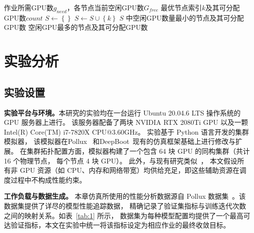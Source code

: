 \begin{algorithm}[htbp]
  \caption{节点选择}
  \label{alg:selectnode}
  \begin{algorithmic}[1]
    \REQUIRE 作业所需GPU数$g_{need}$，各节点当前空闲GPU数$G_{free}$
    \ENSURE 最优节点索引$k$及其可分配GPU数$count$
    \STATE $S \leftarrow \left\{\right\}$
        \STATE $S \leftarrow S \cup \left\{k\right\}$
      \ENDIF
    \ENDFOR
      \RETURN $S$ 中空闲GPU数量最小的节点及其可分配GPU数
    \ELSE
      \RETURN 空闲GPU最多的节点及其可分配GPU数
    \ENDIF
  \end{algorithmic}
\end{algorithm}

\section{实验分析}\label{sec:chap3-experiment}

\subsection{实验设置}\label{subsec:experiment-setup}

\textbf{实验平台与环境。}本研究的实验均在一台运行 Ubuntu 20.04.6 LTS 操作系统的 GPU 服务器上进行。
该服务器配备了两块 NVIDIA RTX 2080Ti GPU 以及一颗 Intel(R) Core(TM) i7-7820X CPU@3.60GHz。
实验基于 Python 语言开发的集群模拟器，
该模拟器在Pollux~\cite{qiao2021pollux} 和DeepBoot~\cite{chen2023deepboot}现有的仿真框架基础上进行修改与扩展。
在集群拓扑配置方面，模拟器构建了一个包含 64 块 GPU 的同构集群（共计 16 个物理节点， 每个节点 4 块 GPU）。
此外，与现有研究类似~\cite{gu2023elasticflow,jayaram2023sia}，
本文假设所有非 GPU 资源（如 CPU、内存和网络带宽）均供给充足，即这些辅助资源在调度过程中不构成性能约束。

\textbf{工作负载与数据生成。}
本章仿真所使用的性能分析数据源自 Pollux 数据集~\cite{qiao2021pollux}。该数据集提供了详尽的模型性能追踪数据，
精确记录了验证集指标与训练迭代次数之间的映射关系。如表~\ref{tab:1} 所示，
数据集为每种模型配置均提供了一个最高可达验证指标，本文在实验中统一将该指标设定为相应作业的最终收敛目标。

